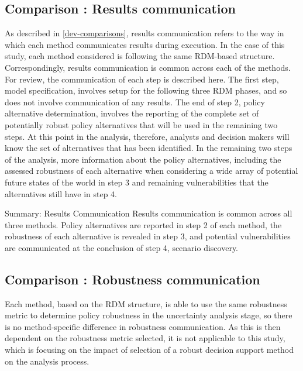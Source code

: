     \subsection{Comparison \thecomparison : Results communication} 
    As described in \cref{dev-comparisons}, results communication refers to the way in which each method communicates results during execution. In the case of this study, each method considered is following the same RDM-based structure. Correspondingly, results communication is common across each of the methods. For review, the communication of each step is described here. The first step, model specification, involves setup for the following three RDM phases, and so does not involve communication of any results. The end of step 2, policy alternative determination, involves the reporting of the complete set of potentially robust policy alternatives that will be used in the remaining two steps. At this point in the analysis, therefore, analysts and decision makers will know the set of alternatives that has been identified. In the remaining two steps of the analysis, more information about the policy alternatives, including the assessed robustness of each alternative when considering a wide array of potential future states of the world in step 3 and remaining vulnerabilities that the alternatives still have in step 4. 
    
    \begin{comparisonbox}{Summary: Results Communication}
        Results communication is common across all three methods. Policy alternatives are reported in step 2 of each method, the robustness of each alternative is revealed in step 3, and potential vulnerabilities are communicated at the conclusion of step 4, scenario discovery.
    \end{comparisonbox}
    
    \subsection{Comparison \thecomparison : Robustness communication} 
    Each method, based on the RDM structure, is able to use the same robustness metric to determine policy robustness in the uncertainty analysis stage, so there is no method-specific difference in robustness communication. As this is then dependent on the robustness metric selected, it is not applicable to this study, which is focusing on the impact of selection of a robust decision support method on the analysis process. 
    
